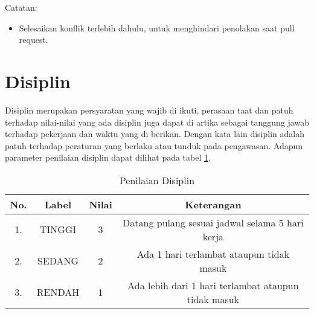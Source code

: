 Catatan:
\begin{itemize}
\item Selesaikan konflik terlebih dahulu, untuk menghindari penolakan saat pull request.
\end{itemize}

\section{Disiplin}
Disiplin merupakan persyaratan yang wajib di ikuti, perasaan taat dan patuh terhadap nilai-nilai yang ada disiplin juga dapat di artika sebagai tanggung jawab terhadap pekerjaan dan waktu yang di berikan. Dengan kata lain disiplin adalah patuh terhadap peraturan yang berlaku
atau tunduk pada pengawasan. Adapun parameter penilaian disiplin dapat dilihat pada tabel \ref{table:nilaidisiplin}.

\begin{table}[H]
\caption{Penilaian Disiplin}
\centering
\begin{tabular}{|c|c|c|c|}
\hline
\textbf{No.}&\textbf{Label}&\textbf{Nilai}&\textbf{Keterangan}\\
\hline
1.&TINGGI&3&Datang pulang sesuai jadwal selama 5 hari kerja\\
\hline
2.&SEDANG&2&Ada 1 hari terlambat ataupun tidak masuk\\
\hline
3.&RENDAH&1&Ada lebih dari 1 hari terlambat ataupun tidak masuk\\
\hline
\end{tabular}
\label{table:nilaidisiplin}
\end{table}

